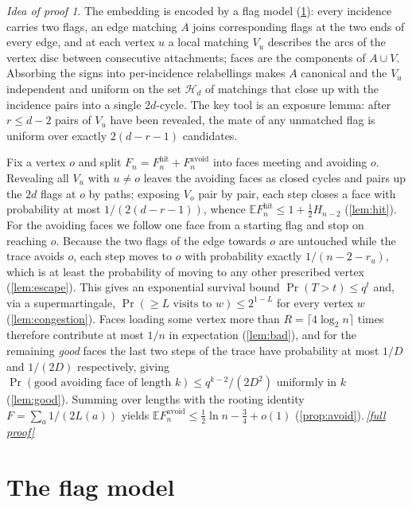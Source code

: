 \documentclass[11pt,a4paper]{article}
\theoremstyle{plain}
\theoremstyle{definition}
\theoremstyle{remark}
\newtheorem*{proofidea}{Idea of proof}
\newcommand{\fullproofref}[1]{\,\hyperref[#1]{\textit{[full proof]}}}
\newcommand{\E}{\mathbb E}
\newcommand{\cH}{\mathcal H}
\newcommand{\Fhit}{F_n^{\mathrm{hit}}}
\newcommand{\Favoid}{F_n^{\mathrm{avoid}}}
\begin{document}
\begin{proofidea}
The embedding is encoded by a flag model (\cref{sec:model}): every incidence carries two flags, an edge matching $A$ joins corresponding flags at the two ends of every edge, and at each vertex $u$ a local matching $V_u$ describes the arcs of the vertex disc between consecutive attachments; faces are the components of $A\cup V$. Absorbing the signs into per-incidence relabellings makes $A$ canonical and the $V_u$ independent and uniform on the set $\cH_d$ of matchings that close up with the incidence pairs into a single $2d$-cycle. The key tool is an exposure lemma: after $r\le d-2$ pairs of $V_u$ have been revealed, the mate of any unmatched flag is uniform over exactly $2(d-r-1)$ candidates.

Fix a vertex $o$ and split $F_n=\Fhit+\Favoid$ into faces meeting and avoiding $o$. Revealing all $V_u$ with $u\ne o$ leaves the avoiding faces as closed cycles and pairs up the $2d$ flags at $o$ by paths; exposing $V_o$ pair by pair, each step closes a face with probability at most $1/(2(d-r-1))$, whence $\E\Fhit\le1+\tfrac12H_{n-2}$ (\cref{lem:hit}). For the avoiding faces we follow one face from a starting flag and stop on reaching $o$. Because the two flags of the edge towards $o$ are untouched while the trace avoids $o$, each step moves to $o$ with probability exactly $1/(n-2-r_u)$, which is at least the probability of moving to any other prescribed vertex (\cref{lem:escape}). This gives an exponential survival bound $\Pr(T>t)\le q^t$ and, via a supermartingale, $\Pr(\text{$\ge L$ visits to $w$})\le2^{1-L}$ for every vertex $w$ (\cref{lem:congestion}). Faces loading some vertex more than $R=\lceil4\log_2 n\rceil$ times therefore contribute at most $1/n$ in expectation (\cref{lem:bad}), and for the remaining \emph{good} faces the last two steps of the trace have probability at most $1/D$ and $1/(2D)$ respectively, giving $\Pr(\text{good avoiding face of length }k)\le q^{k-2}/(2D^2)$ uniformly in $k$ (\cref{lem:good}). Summing over lengths with the rooting identity $F=\sum_a1/(2L(a))$ yields $\E\Favoid\le\tfrac12\ln n-\tfrac34+o(1)$ (\cref{prop:avoid}).\fullproofref{pf:main}
\end{proofidea}

\section{The flag model}\label{sec:model}
\end{document}
